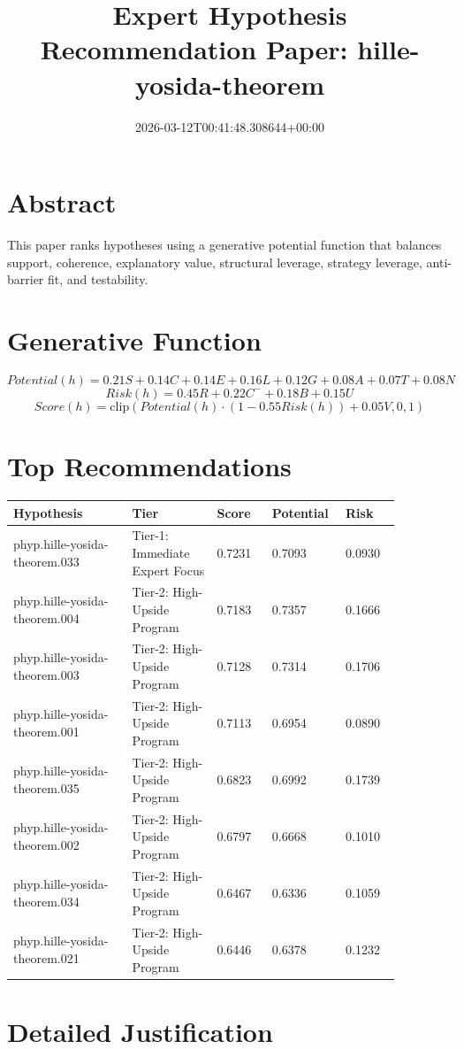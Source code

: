 \documentclass[11pt]{article}
\title{Expert Hypothesis Recommendation Paper: hille-yosida-theorem}
\date{2026-03-12T00:41:48.308644+00:00}
\begin{document}
\maketitle
\section*{Abstract}
This paper ranks hypotheses using a generative potential function that balances support, coherence, explanatory value, structural leverage, strategy leverage, anti-barrier fit, and testability.
\section*{Generative Function}
\[
Potential(h) = 0.21S + 0.14C + 0.14E + 0.16L + 0.12G + 0.08A + 0.07T + 0.08N
\]
\[
Risk(h) = 0.45R + 0.22C^- + 0.18B + 0.15U
\]
\[
Score(h) = \mathrm{clip}(Potential(h) \cdot (1 - 0.55 Risk(h)) + 0.05V, 0, 1)
\]
\section*{Top Recommendations}
\begin{longtable}{p{0.28\linewidth}p{0.20\linewidth}p{0.13\linewidth}p{0.13\linewidth}p{0.13\linewidth}}
\toprule
Hypothesis & Tier & Score & Potential & Risk \\
\midrule
\endhead
phyp.hille-yosida-theorem.033 & Tier-1: Immediate Expert Focus & 0.7231 & 0.7093 & 0.0930 \\
phyp.hille-yosida-theorem.004 & Tier-2: High-Upside Program & 0.7183 & 0.7357 & 0.1666 \\
phyp.hille-yosida-theorem.003 & Tier-2: High-Upside Program & 0.7128 & 0.7314 & 0.1706 \\
phyp.hille-yosida-theorem.001 & Tier-2: High-Upside Program & 0.7113 & 0.6954 & 0.0890 \\
phyp.hille-yosida-theorem.035 & Tier-2: High-Upside Program & 0.6823 & 0.6992 & 0.1739 \\
phyp.hille-yosida-theorem.002 & Tier-2: High-Upside Program & 0.6797 & 0.6668 & 0.1010 \\
phyp.hille-yosida-theorem.034 & Tier-2: High-Upside Program & 0.6467 & 0.6336 & 0.1059 \\
phyp.hille-yosida-theorem.021 & Tier-2: High-Upside Program & 0.6446 & 0.6378 & 0.1232 \\
\bottomrule
\end{longtable}
\section*{Detailed Justification}
\end{document}
